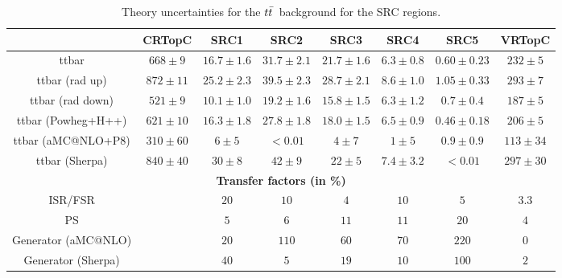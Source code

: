 \begin{description}
 \begin{table}[!h]
    \begin{center} \footnotesize
      \begin{tabular}{|c|c|c|c|c|c|c|c|}
        \hline
        & CRTopC & SRC1 & SRC2 & SRC3 & SRC4 & SRC5 & VRTopC\\
        \hline
ttbar&   $668\pm 9 $&    $16.7\pm 1.6 $&         $31.7\pm 2.1 $&         $21.7\pm 1.6 $&         $6.3\pm 0.8 $&          $0.60\pm 0.23 $&         $232\pm 5 $\\
ttbar (rad up)&          $872\pm 11 $&   $25.2\pm 2.3 $&         $39.5\pm 2.3 $&         $28.7\pm 2.1 $&         $8.6\pm 1.0 $&  $1.05\pm 0.33 $&         $293\pm 7 $\\
ttbar (rad down)&        $521\pm 9 $&    $10.1\pm 1.0 $&         $19.2\pm 1.6 $&         $15.8\pm 1.5 $&         $6.3\pm 1.2 $&  $0.7\pm 0.4 $&   $187\pm 5 $\\
ttbar (Powheg+H++)&      $621\pm 10 $&   $16.3\pm 1.8 $&         $27.8\pm 1.8 $&         $18.0\pm 1.5 $&         $6.5\pm 0.9 $&  $0.46\pm 0.18 $&         $206\pm 5 $\\
ttbar (aMC@NLO+P8)&      $310\pm 60 $&   $6\pm 5 $&      $<0.01$&        $4\pm 7 $&      $1\pm 5 $&      $0.9\pm 0.9 $&          $113\pm 34 $\\
ttbar (Sherpa)&          $840\pm 40 $&   $30\pm 8 $&     $42\pm 9 $&     $22\pm 5 $&     $7.4\pm 3.2 $&          $<0.01$&        $297\pm 30 $\\        
        \hline
        \multicolumn{8}{c}{\bf Transfer factors (in \%)} \\ \hline
        ISR/FSR &  &      $20$&   $10$&   $4$&    $10$&   $5$&    $3.3$\\
        PS &     &   $5$&    $6$&    $11$&   $11$&   $20$&   $4$\\
        Generator (aMC@NLO) &   &     $20$&   $110$&          $60$&   $70$&   $220$&          $0$\\
        Generator (Sherpa) &    &    $40$&   $5$&    $19$&   $10$&   $100$&          $2$\\
        \hline       
        \end{tabular}
    \end{center}
    \caption{Theory uncertainties for the $t\bar{t}$\ background for the SRC regions.}
    \label{tab:ttbar_unc_SRC}
  \end{table}


\end{description}
